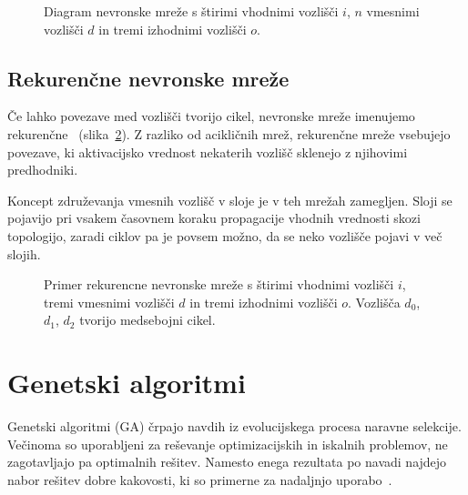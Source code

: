 \documentclass[a4paper,12pt,openright]{book}
\begin{document}
    \begin{figure}[H]
        \begin{center}
            
        \end{center}
        \caption{Diagram nevronske mreže s štirimi vhodnimi vozlišči $i$, $n$ vmesnimi vozlišči $d$ in tremi izhodnimi vozlišči $o$.}
        \label{fig:diagram-mreze}
    \end{figure}


    \subsection{Rekurenčne nevronske mreže}\label{subsec:rekurencne-nevronske-mreze}
    Če lahko povezave med vozlišči tvorijo cikel, nevronske mreže imenujemo rekurenčne~\cite{recurrent_neural_network_wiki} (slika~\ref{fig:diagram-rekurencne-mreze}).
    Z razliko od acikličnih mrež, rekurenčne mreže vsebujejo povezave, ki aktivacijsko vrednost nekaterih vozlišč
    sklenejo z njihovimi predhodniki.

    Koncept združevanja vmesnih vozlišč v sloje je v teh mrežah zamegljen.
    Sloji se pojavijo pri vsakem časovnem koraku propagacije vhodnih vrednosti skozi topologijo, zaradi ciklov pa je povsem možno,
    da se neko vozlišče pojavi v več slojih.
    \begin{figure}[H]
        \begin{center}
            
        \end{center}
        \caption{Primer rekurencne nevronske mreže s štirimi vhodnimi vozlišči $i$, tremi vmesnimi vozlišči $d$ in tremi izhodnimi vozlišči $o$.
        Vozlišča $d_0$, $d_1$, $d_2$ tvorijo medsebojni cikel.}
        \label{fig:diagram-rekurencne-mreze}
    \end{figure}

    \newpage
    \section{Genetski algoritmi}\label{sec:genetski-algoritmi}
    Genetski algoritmi (GA) črpajo navdih iz evolucijskega procesa naravne selekcije.
    Večinoma so uporabljeni za reševanje optimizacijskih in iskalnih problemov, ne zagotavljajo pa optimalnih rešitev.
    Namesto enega rezultata po navadi najdejo nabor rešitev dobre kakovosti, ki so primerne za nadaljnjo
    uporabo~\cite{inteligentni_sistemi_2010,genetic_algorithm_wiki_2022}.
\end{document}
